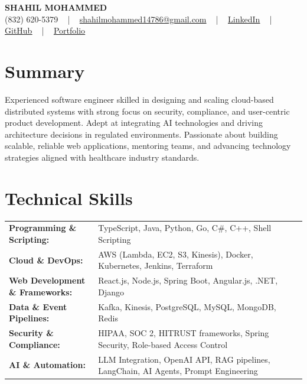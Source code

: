 \documentclass[letterpaper,11pt]{article}
\begin{document}
\begin{center}
    {\fontsize{14pt}{12pt}\selectfont \textbf{\MakeUppercase{Shahil Mohammed}}}\\ \vspace{2pt}
    \fontsize{10pt}{12pt}\selectfont (832) 620-5379 ~ | ~ \href{mailto:shahilmohammed14786@gmail.com}{shahilmohammed14786@gmail.com} ~ | ~  
    \href{https://www.linkedin.com/in/shahil-mohammed-9652931a1/}{\color{blue}\underline{LinkedIn}}  ~ | ~ 
    \href{https://github.com/freakbeast14}{\color{blue}\underline{GitHub}} ~ | ~ 
    \href{https://shahil-mohammed.netlify.app/}{\color{blue}\underline{Portfolio}}
    \vspace{-8pt}
\end{center}

\section{Summary}
\fontsize{9pt}{10pt}\selectfont
Experienced software engineer skilled in designing and scaling cloud-based distributed systems with strong focus on security, compliance, and user-centric product development. Adept at integrating AI technologies and driving architecture decisions in regulated environments. Passionate about building scalable, reliable web applications, mentoring teams, and advancing technology strategies aligned with healthcare industry standards.
 \vspace{-5pt}
 
\section{Technical Skills}
        \vspace{-14pt}
        \begin{table}[h]
            \fontsize{9pt}{10pt}\selectfont
            \begin{tabular}{p{0.3\linewidth} p{0.7\linewidth}}
                \textbf{Programming \& Scripting:} & TypeScript, Java, Python, Go, C\#, C++, Shell Scripting \\
                \textbf{Cloud \& DevOps:} & AWS (Lambda, EC2, S3, Kinesis), Docker, Kubernetes, Jenkins, Terraform \\
                \textbf{Web Development \& Frameworks:} & React.js, Node.js, Spring Boot, Angular.js, .NET, Django \\
                \textbf{Data \& Event Pipelines:} & Kafka, Kinesis, PostgreSQL, MySQL, MongoDB, Redis \\
                \textbf{Security \& Compliance:} & HIPAA, SOC 2, HITRUST frameworks, Spring Security, Role-based Access Control \\
                \textbf{AI \& Automation:} & LLM Integration, OpenAI API, RAG pipelines, LangChain, AI Agents, Prompt Engineering \\
            \end{tabular}
        \end{table}
 \vspace{-15pt}
 
\end{document}
